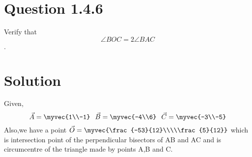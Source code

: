 \documentclass[journal,12pt,twocolumn]{IEEEtran}
\theoremstyle{remark}
\begin{document}
\section{Question 1.4.6}
Verify that$$\angle{BOC} = 2\angle{BAC}$$.

\section{Solution}
\vspace{0.5cm}
Given,$$\vec{A}=\myvec{1\\-1}
\hspace{0.25cm}
\vec{B}=\myvec{-4\\6}
\hspace{0.25cm}
\vec{C}=\myvec{-3\\-5}$$
Also,we have a point $\vec{O}=\myvec{\frac{-53}{12}\\\\\frac{5}{12}}$ 
which is intersection point of the perpendicular bisectors of AB and AC and is circumcentre of the triangle made by points A,B and C.
\vspace{0.25cm}
\end{document}
